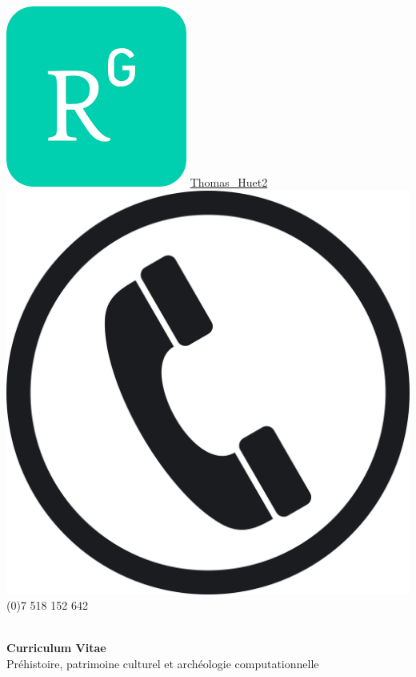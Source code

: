 \documentclass{article}
\begin{document}
\includegraphics[scale=0.05]{rgate} \quad \href{https://www.researchgate.net/profile/Thomas\_Huet2}{Thomas\_Huet2} \\
\includegraphics[scale=0.005]{phone} \quad  {} (0)7 518 152 642 \\

\\

\begin{adjustwidth}{50pt}{50pt}
\begin{center}
\large{\textbf{Curriculum Vitae}}\\
\large{Préhistoire, patrimoine culturel et archéologie computationnelle} 
\end{center}
\end{adjustwidth}
\end{document}
